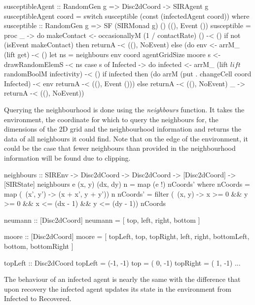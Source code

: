 \begin{HaskellCode}
susceptibleAgent :: RandomGen g => Disc2dCoord -> SIRAgent g
susceptibleAgent coord = switch susceptible (const (infectedAgent coord))
  where
    susceptible :: RandomGen g => SF (SIRMonad g) () ((), Event ())
    susceptible = proc _ -> do
      makeContact <- occasionallyM (1 / contactRate) () -< ()
      if not (isEvent makeContact)
        then returnA -< ((), NoEvent)
        else (do
          env <- arrM_ (lift get) -< ()
          let ns = neighbours env coord agentGridSize moore
          s <- drawRandomElemS -< ns
          case s of
            Infected -> do
              infected <- arrM_ (lift $ lift $ randomBoolM infectivity) -< ()
              if infected 
                then (do
                  arrM (put . changeCell coord Infected) -< env
                  returnA -< ((), Event ()))
                else returnA -< ((), NoEvent)
            _        -> returnA -< ((), NoEvent))

\end{HaskellCode}
Querying the neighbourhood is done using the \textit{neighbours} function. It takes the environment, the coordinate for which to query the neighbours for, the dimensions of the 2D grid and the neighbourhood information and returns the data of all neighbours it could find. Note that on the edge of the environment, it could be the case that fewer neighbours than provided in the neighbourhood information will be found due to clipping.

\begin{HaskellCode}
neighbours :: SIREnv -> Disc2dCoord -> Disc2dCoord -> [Disc2dCoord] -> [SIRState]
neighbours e (x, y) (dx, dy) n = map (e !) nCoords'
  where
    nCoords  = map (\ (x', y') -> (x + x', y + y')) n
    nCoords' = filter (\ (x, y) -> x >= 0 && y >= 0 && 
                                   x <= (dx - 1) && y <= (dy - 1)) nCoords
                           
neumann :: [Disc2dCoord]
neumann = [ top, left, right, bottom ]

moore :: [Disc2dCoord]
moore = [ topLeft,    top,    topRight,
          left,               right,
          bottomLeft, bottom, bottomRight ]

topLeft :: Disc2dCoord
topLeft  = (-1, -1)
top      = ( 0, -1)
topRight = ( 1, -1)
...
\end{HaskellCode}

The behaviour of an infected agent is nearly the same with the difference that upon recovery the infected agent updates its state in the environment from Infected to Recovered.

